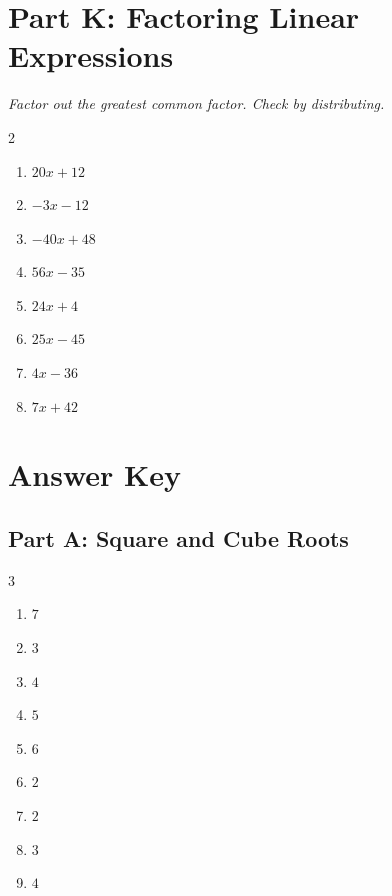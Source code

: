 \documentclass[11pt]{article}
\begin{document}
\section*{Part K: Factoring Linear Expressions}
\noindent\textit{Factor out the greatest common factor. Check by distributing.}
\begin{multicols}{2}
\begin{enumerate}
  \item $20x + 12$
  \vspace{1.3cm}
  \item $-3x - 12$
  \vspace{1.3cm}
  \item $-40x + 48$
  \vspace{1.3cm}
  \item $56x - 35$
  \vspace{1.3cm}
  \item $24x + 4$
  \vspace{1.3cm}
  \item $25x - 45$
  \vspace{1.3cm}
  \item $4x - 36$
  \vspace{1.3cm}
  \item $7x + 42$
  \vspace{1.3cm}
\end{enumerate}
\end{multicols}

\newpage
{}
\section*{Answer Key}
\subsection*{Part A: Square and Cube Roots}
\begin{multicols}{3}
\begin{enumerate}
  \item $7$
  \item $3$
  \item $4$
  \item $5$
  \item $6$
  \item $2$
  \item $2$
  \item $3$
  \item $4$
\end{enumerate}
\end{multicols}
\end{document}
